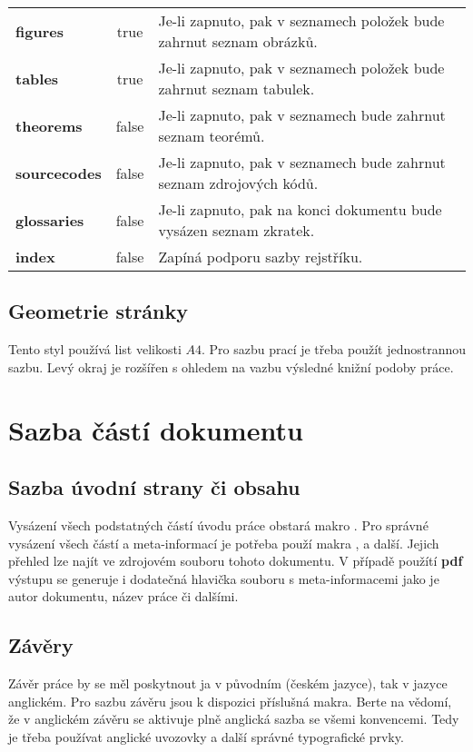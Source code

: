 \documentclass[
  master=false,               %
  font=sans,                  %
  printversion=false,         %
  joinlists=true,             %
  glossaries=true,            %
  figures=true,               %
  tables=true,                %
  sourcecodes=true,					  %
  theorems=true,						  %
  bibencoding=utf8,           %
  language=czech,             %
  encoding=utf8,              %
  field=inf,                  %
  index=true,                 %
]{updiplom}
\begin{document}
\begin{table}
\begin{center}
\begin{tabular}{>{\bfseries}l >{\ttfamily}c L{8cm}}
figures & true & Je-li zapnuto, pak v seznamech položek bude zahrnut seznam obrázků. \\

tables & true & Je-li zapnuto, pak v seznamech položek bude zahrnut seznam tabulek. \\

theorems & false & Je-li zapnuto, pak v seznamech bude zahrnut seznam teorémů. \\

sourcecodes & false & Je-li zapnuto, pak v seznamech bude zahrnut seznam zdrojových kódů. \\

glossaries & false & Je-li zapnuto, pak na konci dokumentu bude vysázen seznam zkratek. \\

index & false & Zapíná podporu sazby rejstříku.
\end{tabular}
\end{center}
\end{table}

\subsection{Geometrie stránky}
Tento styl používá list velikosti $A4$. Pro sazbu prací je třeba použít jednostrannou sazbu. Levý okraj je rozšířen s ohledem na vazbu výsledné knižní podoby práce.

\section{Sazba částí dokumentu}
\subsection{Sazba úvodní strany či obsahu}
Vysázení všech podstatných částí úvodu práce obstará makro . Pro správné vysázení všech částí a meta-informací je potřeba použí makra ,  a další. Jejich přehled lze najít ve zdrojovém souboru tohoto dokumentu. V případě použítí \textbf{pdf} výstupu se generuje i dodatečná hlavička souboru s meta-informacemi jako je autor dokumentu, název práce či dalšími.

\subsection{Závěry}
Závěr práce by se měl poskytnout ja v původním (českém jazyce), tak v jazyce anglickém. Pro sazbu závěru jsou k dispozici příslušná makra. Berte na vědomí, že v anglickém závěru se aktivuje plně anglická sazba se všemi konvencemi. Tedy je třeba používat anglické uvozovky a další správné typografické prvky.
\end{document}
